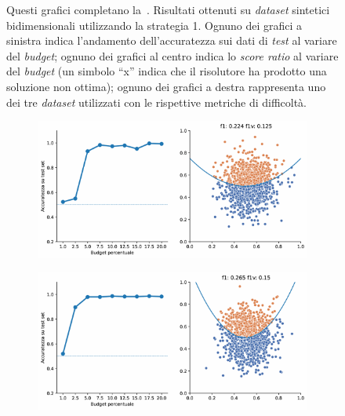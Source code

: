 \begin{appendices}
\begin{figure}[ht]
\begin{subfigure}{.8\textwidth}
    \end{subfigure}%
    \caption[Risultati su \emph{dataset} sintetici utilizzando la strategia 1.]{Questi grafici completano la~. Risultati ottenuti su \emph{dataset} sintetici bidimensionali utilizzando la strategia 1. Ognuno dei grafici a sinistra indica l'andamento dell'accuratezza sui dati di \emph{test} al variare del \emph{budget}; ognuno dei grafici al centro indica lo \emph{score ratio} al variare del \emph{budget} (un simbolo ``x'' indica che il risolutore ha prodotto una soluzione non ottima); ognuno dei grafici a destra rappresenta uno dei tre \emph{dataset} utilizzati con le rispettive metriche di difficoltà.}
\end{figure}

\begin{figure}[b!]
    \centering
    \begin{subfigure}{.8\textwidth}
        \centering
        \includegraphics[width=\textwidth]{img/2d_v2/1.pdf}
    \end{subfigure}%
    \hfill
    \begin{subfigure}{.8\textwidth}
        \centering
        \includegraphics[width=\textwidth]{img/2d_v2/2.pdf}
    \end{subfigure}

\end{figure}
\end{appendices}
